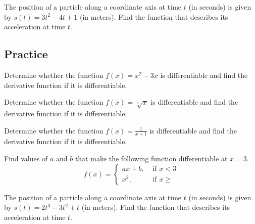 \begin{example}
The position of a particle along a coordinate axis at time \(t\) (in
seconds) is given by \(s(t)=3t^2-4t+1\) (in meters). Find the function
that describes its acceleration at time \(t\).
\end{example}
\vspace*{6\baselineskip}

\subsection{Practice}

\begin{exercise}
  Determine whether the function \(f(x)=x^2-3x\) is differentiable and
  find the derivative function if it is differentiable.
  \end{exercise}
  \vspace*{6\baselineskip}
  
  \begin{exercise}
  Determine whether the function \(f(x)=\sqrt[3]{x}\) is differentiable
  and find the derivative function if it is differentiable.
  \end{exercise}
  \vspace*{6\baselineskip}
  
  \begin{exercise}
  Determine whether the function \(f(x)=\frac{1}{x+1}\) is differentiable
  and find the derivative function if it is differentiable.
  \end{exercise}
  \vspace*{6\baselineskip}
  
\begin{exercise}
Find values of \(a\) and \(b\) that make the following function
differentiable at \(x=3\).
\[f(x)=\begin{cases}ax+b, & \text{ if } x<3\\x^2,& \text{ if } x\ge \end{cases}\]
\end{exercise}
\vspace*{6\baselineskip}

\begin{exercise}
The position of a particle along a coordinate axis at time \(t\) (in
seconds) is given by \(s(t)=2t^3-3t^2+t\) (in meters). Find the function
that describes its acceleration at time \(t\).
\end{exercise}
\vspace*{6\baselineskip}

